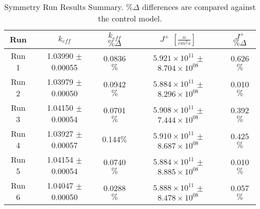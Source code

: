 
\begin{table}[H]
\centering
 \begin{tabularx}{0.7\textwidth}{c  c  c  c  c}
 	\hline
 	Run & $k_{eff}$ & $k_{eff}$ $\% \Delta$ & $J^+$  $[\frac{n}{cm^2s}]$ & $J^+$ $\% \Delta$  \\
 	\hline
 	Run 1 & 1.03990 $\pm$ 0.00055 & 0.0836$\%$ & $5.921\times10^{11}$ $\pm$ $8.704\times10^{08}$ & 0.626$\%$ \\
 	Run 2 & 1.03979 $\pm$ 0.00050 & 0.0942$\%$ & $5.884\times10^{11}$ $\pm$ $8.296\times10^{08}$ & 0.010$\%$ \\
 	Run 3 & 1.04150 $\pm$ 0.00054 & 0.0701$\%$ & $5.908\times10^{11}$ $\pm$ $7.444\times10^{08}$ & 0.392$\%$ \\
 	Run 4 & 1.03927 $\pm$ 0.00057 & 0.144$\%$ & $5.910\times10^{11}$ $\pm$ $8.687\times10^{08}$ & 0.425$\%$ \\
 	Run 5 & 1.04154 $\pm$ 0.00054 & 0.0740$\%$ & $5.884\times10^{11}$ $\pm$ $8.885\times10^{08}$ & 0.010$\%$ \\
 	Run 6 & 1.04047 $\pm$ 0.00050 & 0.0288$\%$ & $5.888\times10^{11}$ $\pm$ $8.478\times10^{08}$ & 0.057$\%$ \\
 	\hline

 \end{tabularx}
 \caption[Symmetry Run Results Summary]{Symmetry Run Results Summary.  $\%\Delta$ differences are compared against the control model.}
\label{table:slicesens}
\end{table}